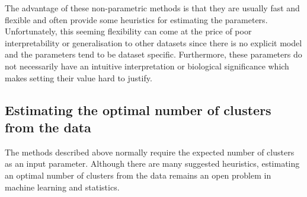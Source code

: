 The advantage of these non-parametric methods is that they are usually fast and flexible and often provide some heuristics for estimating the parameters.  
Unfortunately, this seeming flexibility can come at the price of poor interpretability or generalisation to other datasets since there is no explicit model
and the parameters tend to be dataset specific.
Furthermore, these parameters do not necessarily have an intuitive interpretation or biological significance which makes setting their value hard to justify.


\subsection{Estimating the optimal number of clusters from the data}

The methods described above normally require the expected number of clusters as an input parameter.
Although there are many suggested heuristics,
estimating an optimal number of clusters from the data remains an open problem in machine learning and statistics.


